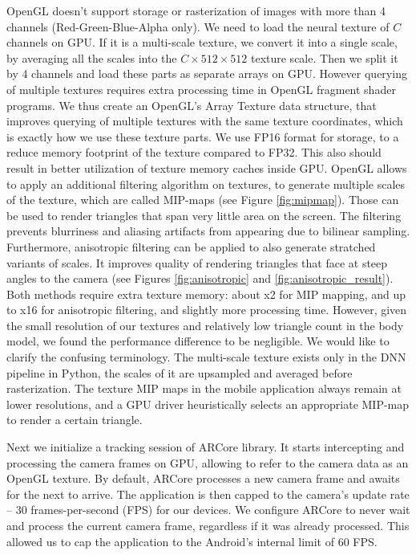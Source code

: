 OpenGL doesn't support storage or rasterization of images with more than 4 channels (Red-Green-Blue-Alpha only). We need to load the neural texture of $C$ channels on GPU. If it is a multi-scale texture, we convert it into a single scale, by averaging all the scales into the $C \times 512 \times 512$ texture scale. Then we split it by 4 channels and load these parts as separate arrays on GPU. However querying of multiple textures requires extra processing time in OpenGL fragment shader programs. We thus create an OpenGL's Array Texture data structure, that improves querying of multiple textures with the same texture coordinates, which is exactly how we use these texture parts. We use FP16 format for storage, to a reduce memory footprint of the texture compared to FP32. This also should result in better utilization of texture memory caches inside GPU. OpenGL allows to apply an additional filtering algorithm on textures, to generate multiple scales of the texture, which are called MIP-maps (see Figure \ref{fig:mipmap}). Those can be used to render triangles that span very little area on the screen. The filtering prevents blurriness and aliasing artifacts from appearing due to bilinear sampling. Furthermore, anisotropic filtering can be applied to also generate stratched variants of scales. It improves quality of rendering triangles that face at steep angles to the camera (see Figures \ref{fig:anisotropic} and \ref{fig:anisotropic_result}). Both methods require extra texture memory: about x2 for MIP mapping, and up to x16 for anisotropic filtering, and slightly more processing time. However, given the small resolution of our textures and relatively low triangle count in the body model, we found the performance difference to be negligible. We would like to clarify the confusing terminology. The multi-scale texture exists only in the DNN pipeline in Python, the scales of it are upsampled and averaged before rasterization. The texture  MIP maps in the mobile application always remain at lower resolutions, and a GPU driver heuristically selects an appropriate MIP-map to render a certain triangle.

Next we initialize a tracking session of ARCore library. It starts intercepting and processing the camera frames on GPU, allowing to refer to the camera data as an OpenGL texture. By default, ARCore processes a new camera frame and awaits for the next to arrive. The application is then capped to the camera's update rate -- 30 frames-per-second (FPS) for our devices. We configure ARCore to never wait and process the current camera frame, regardless if it was already processed. This allowed us to cap the application to the Android's internal limit of 60 FPS.

